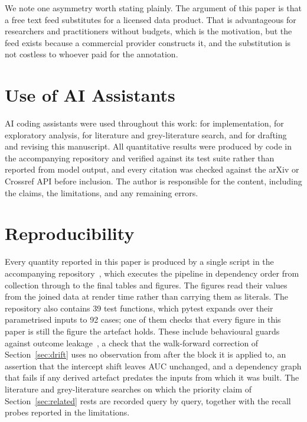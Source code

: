 \documentclass[conference]{IEEEtran}
\begin{document}
We note one asymmetry worth stating plainly. The argument of this paper is
that a free text feed substitutes for a licensed data product. That is
advantageous for researchers and practitioners without budgets, which is the
motivation, but the feed exists because a commercial provider constructs it,
and the substitution is not costless to whoever paid for the annotation.

\section*{Use of AI Assistants}

AI coding assistants were used throughout this work: for implementation, for
exploratory analysis, for literature and grey-literature search, and for
drafting and revising this manuscript. All quantitative results were produced
by code in the accompanying repository and verified against its test suite
rather than reported from model output, and every citation was checked against
the arXiv or Crossref API before inclusion. The author is responsible for the
content, including the claims, the limitations, and any remaining errors.

\section*{Reproducibility}

Every quantity reported in this paper is produced by a single script in the
accompanying repository~\cite{xgfromwords2026}, which executes the pipeline in
dependency order from collection through to the final tables and figures. The
figures read their values from the joined data at render time rather than
carrying them as literals. The repository also contains 39 test functions,
which pytest expands over their parametrised inputs to 92 cases; one of them
checks that every figure in this paper is still the figure the artefact holds. These include behavioural guards against outcome
leakage~\cite{kaufman2012leakage}, a check that the walk-forward correction of
Section~\ref{sec:drift} uses no observation from after the block it is applied
to, an assertion that the intercept shift leaves AUC unchanged, and a
dependency graph that fails if any derived artefact predates the inputs from
which it was built. The literature and grey-literature searches on which the
priority claim of Section~\ref{sec:related} rests are recorded query by query, together with
the recall probes reported in the limitations.
\end{document}
